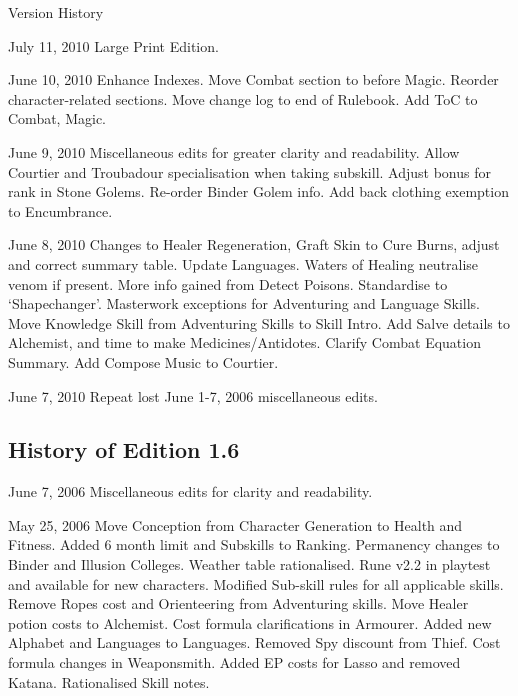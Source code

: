 \begin{Chapter}{Version History}
\begin{Description}

\item[July 11, 2010] Large Print Edition. 

\item[June 10, 2010] Enhance Indexes.  Move Combat section to before
  Magic.  Reorder character-related sections.  Move change log to end
  of Rulebook.  Add ToC to Combat, Magic.

\item[June 9, 2010] Miscellaneous edits for greater clarity and
  readability.  Allow Courtier and Troubadour specialisation when
  taking subskill.  Adjust bonus for rank in Stone Golems. Re-order
  Binder Golem info.  Add back clothing exemption to Encumbrance.

\item[June 8, 2010] Changes to Healer Regeneration, Graft Skin to Cure
  Burns, adjust and correct summary table.  Update Languages.
  Waters of Healing neutralise venom if present. More info gained from
  Detect Poisons.  Standardise to ‘Shapechanger’.  Masterwork
  exceptions for Adventuring and Language Skills. Move Knowledge Skill
  from Adventuring Skills to Skill Intro.  Add Salve details to
  Alchemist, and time to make Medicines/Antidotes.  Clarify Combat
  Equation Summary.  Add Compose Music to Courtier.

\item[June 7, 2010] Repeat lost June 1-7, 2006 miscellaneous edits.

\end{Description}

\subsection{History of Edition 1.6}

\begin{Description}

\item[June 7, 2006] Miscellaneous edits for clarity and readability.

\item[May 25, 2006] Move Conception from Character Generation to
  Health and Fitness.  Added 6 month limit and Subskills to Ranking.
  Permanency changes to Binder and Illusion Colleges.  Weather table
  rationalised. Rune v2.2 in playtest and available for new
  characters.  Modified Sub-skill rules for all applicable skills.
  Remove Ropes cost and Orienteering from Adventuring skills. Move
  Healer potion costs to Alchemist.  Cost formula clarifications in
  Armourer.  Added new Alphabet and Languages to Languages.  Removed
  Spy discount from Thief.  Cost formula changes in Weaponsmith.
  Added EP costs for Lasso and removed Katana.  Rationalised Skill
  notes.


\end{Description}
\end{Chapter}
